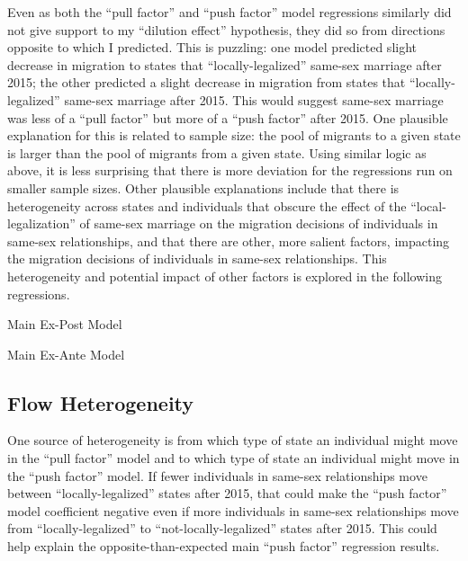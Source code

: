 \documentclass[12pt,letterpaper]{article}
\begin{document}
Even as both the “pull factor” and “push factor” model regressions similarly did not give support to my “dilution effect” hypothesis, they did so from directions opposite to which I predicted. This is puzzling: one model predicted slight decrease in migration to states that “locally-legalized” same-sex marriage after 2015; the other predicted a slight decrease in migration from states that “locally-legalized” same-sex marriage after 2015. This would suggest same-sex marriage was less of a “pull factor” but more of a “push factor” after 2015. One plausible explanation for this is related to sample size: the pool of migrants to a given state is larger than the pool of migrants from a given state. Using similar logic as above, it is less surprising that there is more deviation for the regressions run on smaller sample sizes. Other plausible explanations include that there is heterogeneity across states and individuals that obscure the effect of the “local-legalization” of same-sex marriage on the migration decisions of individuals in same-sex relationships, and that there are other, more salient factors, impacting the migration decisions of individuals in same-sex relationships. This heterogeneity and potential impact of other factors is explored in the following regressions. 

\begin{table}[h]
    \centering
    \caption{Main Ex-Post Model}
    \label{tab: expost_model}
    
\end{table}
\begin{table}[h]
    \centering
    \caption{Main Ex-Ante Model}
    \label{tab: exante_model}
    
\end{table}

\clearpage
\subsection{Flow Heterogeneity}

One source of heterogeneity is from which type of state an individual might move in the “pull factor” model and to which type of state an individual might move in the “push factor” model. If fewer individuals in same-sex relationships move between “locally-legalized” states after 2015, that could make the “push factor” model coefficient negative even if more individuals in same-sex relationships move from “locally-legalized” to “not-locally-legalized” states after 2015. This could help explain the opposite-than-expected main “push factor” regression results.
\end{document}
